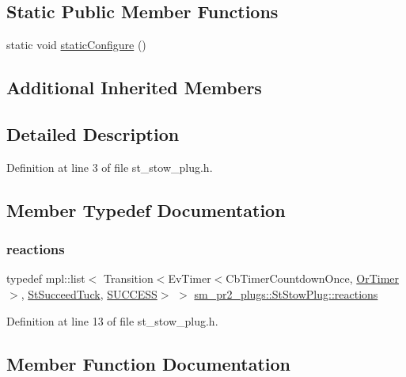\subsection*{Static Public Member Functions}
\begin{DoxyCompactItemize}
\item 
static void \hyperlink{structsm__pr2__plugs_1_1StStowPlug_a42733344b68d5558e349bf56db98efd6}{static\+Configure} ()
\end{DoxyCompactItemize}
\subsection*{Additional Inherited Members}


\subsection{Detailed Description}


Definition at line 3 of file st\+\_\+stow\+\_\+plug.\+h.



\subsection{Member Typedef Documentation}
\mbox{\label{structsm__pr2__plugs_1_1StStowPlug_a30e66bd99b3feb400c8896aec05e5c4b}} 
\subsubsection{\texorpdfstring{reactions}{reactions}}
{\footnotesize\ttfamily typedef mpl\+::list$<$ Transition$<$Ev\+Timer$<$Cb\+Timer\+Countdown\+Once, \hyperlink{classsm__pr2__plugs_1_1OrTimer}{Or\+Timer}$>$, \hyperlink{structsm__pr2__plugs_1_1StSucceedTuck}{St\+Succeed\+Tuck}, \hyperlink{classSUCCESS}{S\+U\+C\+C\+E\+SS}$>$ $>$ \hyperlink{structsm__pr2__plugs_1_1StStowPlug_a30e66bd99b3feb400c8896aec05e5c4b}{sm\+\_\+pr2\+\_\+plugs\+::\+St\+Stow\+Plug\+::reactions}}



Definition at line 13 of file st\+\_\+stow\+\_\+plug.\+h.



\subsection{Member Function Documentation}
\mbox{\label{structsm__pr2__plugs_1_1StStowPlug_a69f661686818a913827a9048ebe4d259}} 
